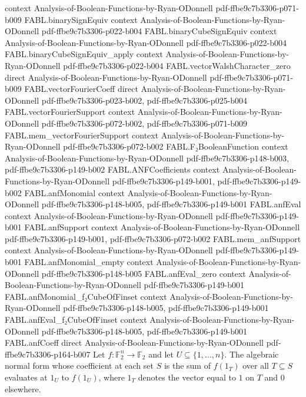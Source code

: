 \begin{theorem}
  {context}
  {Analysis-of-Boolean-Functions-by-Ryan-ODonnell}
  {pdf-ffbe9c7b3306-p071-b009}
\proofstep
  {FABL.binarySignEquiv}
  {context}
  {Analysis-of-Boolean-Functions-by-Ryan-ODonnell}
  {pdf-ffbe9c7b3306-p022-b004}
\proofstep
  {FABL.binaryCubeSignEquiv}
  {context}
  {Analysis-of-Boolean-Functions-by-Ryan-ODonnell}
  {pdf-ffbe9c7b3306-p022-b004}
\proofstep
  {FABL.binaryCubeSignEquiv_apply}
  {context}
  {Analysis-of-Boolean-Functions-by-Ryan-ODonnell}
  {pdf-ffbe9c7b3306-p022-b004}
\proofstep
  {FABL.vectorWalshCharacter_zero}
  {direct}
  {Analysis-of-Boolean-Functions-by-Ryan-ODonnell}
  {pdf-ffbe9c7b3306-p071-b009}
\proofstep
  {FABL.vectorFourierCoeff}
  {direct}
  {Analysis-of-Boolean-Functions-by-Ryan-ODonnell}
  {pdf-ffbe9c7b3306-p023-b002,
    pdf-ffbe9c7b3306-p025-b004}
\proofstep
  {FABL.vectorFourierSupport}
  {context}
  {Analysis-of-Boolean-Functions-by-Ryan-ODonnell}
  {pdf-ffbe9c7b3306-p072-b002,
    pdf-ffbe9c7b3306-p071-b009}
\proofstep
  {FABL.mem_vectorFourierSupport}
  {context}
  {Analysis-of-Boolean-Functions-by-Ryan-ODonnell}
  {pdf-ffbe9c7b3306-p072-b002}
\proofstep
  {FABL.F₂BooleanFunction}
  {context}
  {Analysis-of-Boolean-Functions-by-Ryan-ODonnell}
  {pdf-ffbe9c7b3306-p148-b003,
    pdf-ffbe9c7b3306-p149-b002}
\proofstep
  {FABL.ANFCoefficients}
  {context}
  {Analysis-of-Boolean-Functions-by-Ryan-ODonnell}
  {pdf-ffbe9c7b3306-p149-b001,
    pdf-ffbe9c7b3306-p149-b002}
\proofstep
  {FABL.anfMonomial}
  {context}
  {Analysis-of-Boolean-Functions-by-Ryan-ODonnell}
  {pdf-ffbe9c7b3306-p148-b005,
    pdf-ffbe9c7b3306-p149-b001}
\proofstep
  {FABL.anfEval}
  {context}
  {Analysis-of-Boolean-Functions-by-Ryan-ODonnell}
  {pdf-ffbe9c7b3306-p149-b001}
\proofstep
  {FABL.anfSupport}
  {context}
  {Analysis-of-Boolean-Functions-by-Ryan-ODonnell}
  {pdf-ffbe9c7b3306-p149-b001,
    pdf-ffbe9c7b3306-p072-b002}
\proofstep
  {FABL.mem_anfSupport}
  {context}
  {Analysis-of-Boolean-Functions-by-Ryan-ODonnell}
  {pdf-ffbe9c7b3306-p149-b001}
\proofstep
  {FABL.anfMonomial_empty}
  {context}
  {Analysis-of-Boolean-Functions-by-Ryan-ODonnell}
  {pdf-ffbe9c7b3306-p148-b005}
\proofstep
  {FABL.anfEval_zero}
  {context}
  {Analysis-of-Boolean-Functions-by-Ryan-ODonnell}
  {pdf-ffbe9c7b3306-p149-b001}
\proofstep
  {FABL.anfMonomial_f₂CubeOfFinset}
  {context}
  {Analysis-of-Boolean-Functions-by-Ryan-ODonnell}
  {pdf-ffbe9c7b3306-p148-b005,
    pdf-ffbe9c7b3306-p149-b001}
\proofstep
  {FABL.anfEval_f₂CubeOfFinset}
  {context}
  {Analysis-of-Boolean-Functions-by-Ryan-ODonnell}
  {pdf-ffbe9c7b3306-p148-b005,
    pdf-ffbe9c7b3306-p149-b001}
\proofstep
  {FABL.anfCoeff}
  {direct}
  {Analysis-of-Boolean-Functions-by-Ryan-ODonnell}
  {pdf-ffbe9c7b3306-p164-b007}
Let $f:\mathbb{F}_2^n\to\mathbb{F}_2$ and let $U\subseteq\{1,\ldots,n\}$. The algebraic
normal form whose coefficient at each set $S$ is the sum of $f(1_T)$ over all
$T\subseteq S$ evaluates at $1_U$ to $f(1_U)$, where $1_T$ denotes the vector equal to
$1$ on $T$ and $0$ elsewhere.
\end{theorem}

